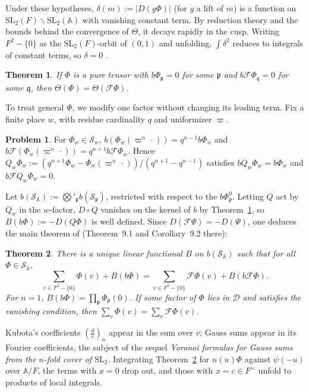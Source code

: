 \documentclass[reqno]{amsart}
\providecommand{\qr}[2]{\left(\frac{#1}{#2}\right)}
\newcommand{\SL}{\mathrm{SL}_2}
\newcommand{\Fc}{\mathcal{F}}
\newcommand{\Dc}{\mathcal{D}}
\newcommand{\Sc}{\mathcal{S}}
\newcommand{\Ab}{\mathbb{A}}
\newcommand{\pp}{\mathfrak{p}}
\numberwithin{equation}{section}
\theoremstyle{definition}
\newtheorem{problem}{Problem}[section]
\theoremstyle{plain}
\newtheorem{theorem}{Theorem}[section]
\begin{document}
Under these hypotheses, $\delta(m) := \lvert D(g \Phi) \rvert$ (for $g$ a lift of $m$) is a function on $\SL(F) \backslash \SL(\Ab)$ with vanishing constant term.  By reduction theory \cite[I.2.1]{MW} and the bounds behind the convergence of $\Theta$, it decays rapidly in the cusp.  Writing $F^2 - \{0\}$ as the $\SL(F)$-orbit of $(0, 1)$ and unfolding, $\int \delta^2$ reduces to integrals of constant terms, so $\delta = 0$ \cite[Proposition~B.6]{N}.

\begin{theorem}\label{th:poisson-vanishing}
  If $\Phi$ is a pure tensor with $b \Phi_\pp = 0$ for some $\pp$ and $b \Fc \Phi_{\mathfrak{q}} = 0$ for some $\mathfrak{q}$, then $\Theta(\Phi) = \Theta(\Fc \Phi)$.
\end{theorem}

To treat general $\Phi$, we modify one factor without changing its leading term.  Fix a finite place $w$, with residue cardinality $q$ and uniformizer $\varpi$.

\begin{problem}\label{pr:projector}
  For $\Phi_w \in \Sc_w$, $b(\Phi_w(\varpi^n \, \cdot)) = q^{n-1} b \Phi_w$ and $b \Fc(\Phi_w(\varpi^n \, \cdot)) = q^{n+1} b \Fc \Phi_w$.  Hence $Q_w \Phi_w := (q^{n+1} \Phi_w - \Phi_w(\varpi^n \, \cdot)) / (q^{n+1} - q^{n-1})$ satisfies $b Q_w \Phi_w = b \Phi_w$ and $b \Fc Q_w \Phi_w = 0$.
\end{problem}

Let $b(\Sc_\Ab) := \bigotimes'_\pp b(\Sc_\pp)$, restricted with respect to the $b \Phi_\pp^0$.  Letting $Q$ act by $Q_w$ in the $w$-factor, $D \circ Q$ vanishes on the kernel of $b$ by Theorem~\ref{th:poisson-vanishing}, so $B(b \Phi) := - D(Q \Phi)$ is well defined.  Since $D(\Fc \Psi) = - D(\Psi)$, one deduces the main theorem of \cite{N} (Theorem~9.1 and Corollary~9.2 there):

\begin{theorem}\label{th:poisson}
  There is a unique linear functional $B$ on $b(\Sc_\Ab)$ such that for all $\Phi \in \Sc_\Ab$,
  \begin{equation*}
    \sum_{v \in F^2 - \{0\}} \Phi(v) + B(b \Phi) = \sum_{v \in F^2 - \{0\}} \Fc \Phi(v) + B(b \Fc \Phi).
  \end{equation*}
  For $n = 1$, $B(b \Phi) = \prod_\pp \Phi_\pp(0)$.  If some factor of $\Phi$ lies in $\Dc$ and satisfies the vanishing condition, then $\sum_v \Phi(v) = \sum_v \Fc \Phi(v)$.
\end{theorem}

Kubota's coefficients $\qr{d}{c}_n$ appear in the sum over $v$; Gauss sums appear in its Fourier coefficients, the subject of the sequel \emph{Voronoi formulas for Gauss sums from the $n$-fold cover of $\mathrm{SL}_2$}.  Integrating Theorem~\ref{th:poisson} for $n(u) \Phi$ against $\psi(-u)$ over $\Ab / F$, the terms with $x = 0$ drop out, and those with $x = c \in F^\times$ unfold to products of local integrals.
\end{document}
